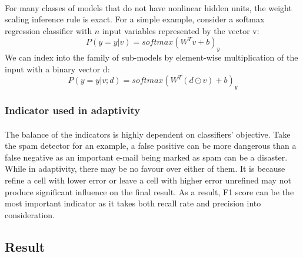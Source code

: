 \paragraph{}
For many classes of models that do not have nonlinear hidden units, the weight scaling inference rule is exact.
For a simple example, consider a softmax regression classifier with $n$ input variables represented by the vector v:
\begin{equation}
    P(y=y|v)=softmax(W^Tv+b)_y
\end{equation}
We can index into the family of sub-models by element-wise multiplication of the input with a binary vector d:
\begin{equation}
    P(y=y|v;d) = softmax(W^T(d \odot v)+b)_y
\end{equation}





\subsubsection{Indicator used in adaptivity}
\paragraph{}
The balance of the indicators is highly dependent on classifiers' objective.
Take the spam detector for an example, a false positive can be more dangerous than a false negative as an important e-mail being marked as spam can be a disaster.
While in adaptivity, there may be no favour over either of them.
It is because refine a cell with lower error or leave a cell with higher error unrefined may not produce significant influence on the final result.
As a result, F1 score can be the most important indicator as it takes both recall rate and precision into consideration.


\subsection{Result}
